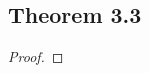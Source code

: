 \documentclass[../../main.tex]{subfiles}
\begin{document}
\subsection{Theorem 3.3}
\begin{wts}

\end{wts}
\begin{proof}

\end{proof}
\end{document}
